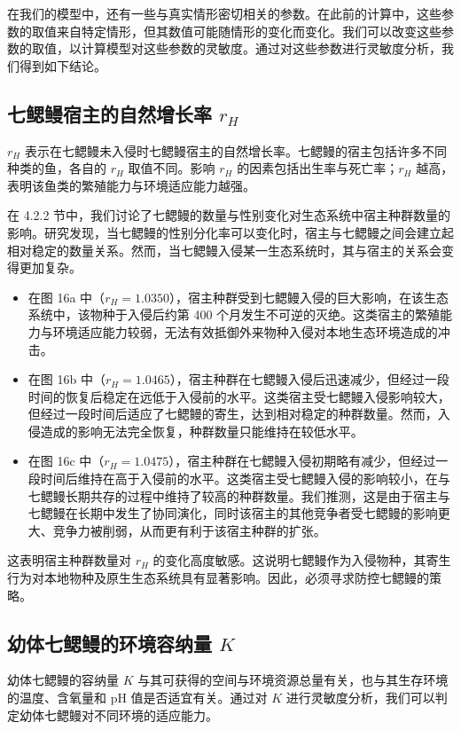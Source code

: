 \documentclass[11pt,a4paper]{ctexart}
\begin{document}
在我们的模型中，还有一些与真实情形密切相关的参数。在此前的计算中，这些参数的取值来自特定情形，但其数值可能随情形的变化而变化。我们可以改变这些参数的取值，以计算模型对这些参数的灵敏度。通过对这些参数进行灵敏度分析，我们得到如下结论。

\subsection{七鳃鳗宿主的自然增长率 $r_H$}

$r_H$ 表示在七鳃鳗未入侵时七鳃鳗宿主的自然增长率。七鳃鳗的宿主包括许多不同种类的鱼，各自的 $r_H$ 取值不同。影响 $r_H$ 的因素包括出生率与死亡率；$r_H$ 越高，表明该鱼类的繁殖能力与环境适应能力越强。

在 4.2.2 节中，我们讨论了七鳃鳗的数量与性别变化对生态系统中宿主种群数量的影响。研究发现，当七鳃鳗的性别分化率可以变化时，宿主与七鳃鳗之间会建立起相对稳定的数量关系。然而，当七鳃鳗入侵某一生态系统时，其与宿主的关系会变得更加复杂。

\begin{itemize}
\item 在图 16a 中（$r_H=1.0350$），宿主种群受到七鳃鳗入侵的巨大影响，在该生态系统中，该物种于入侵后约第 400 个月发生不可逆的灭绝。这类宿主的繁殖能力与环境适应能力较弱，无法有效抵御外来物种入侵对本地生态环境造成的冲击。
\item 在图 16b 中（$r_H=1.0465$），宿主种群在七鳃鳗入侵后迅速减少，但经过一段时间的恢复后稳定在远低于入侵前的水平。这类宿主受七鳃鳗入侵影响较大，但经过一段时间后适应了七鳃鳗的寄生，达到相对稳定的种群数量。然而，入侵造成的影响无法完全恢复，种群数量只能维持在较低水平。
\item 在图 16c 中（$r_H=1.0475$），宿主种群在七鳃鳗入侵初期略有减少，但经过一段时间后维持在高于入侵前的水平。这类宿主受七鳃鳗入侵的影响较小，在与七鳃鳗长期共存的过程中维持了较高的种群数量。我们推测，这是由于宿主与七鳃鳗在长期中发生了协同演化，同时该宿主的其他竞争者受七鳃鳗的影响更大、竞争力被削弱，从而更有利于该宿主种群的扩张。
\end{itemize}

这表明宿主种群数量对 $r_H$ 的变化高度敏感。这说明七鳃鳗作为入侵物种，其寄生行为对本地物种及原生生态系统具有显著影响。因此，必须寻求防控七鳃鳗的策略。

\subsection{幼体七鳃鳗的环境容纳量 $K$}

幼体七鳃鳗的容纳量 $K$ 与其可获得的空间与环境资源总量有关，也与其生存环境的温度、含氧量和 pH 值是否适宜有关。通过对 $K$ 进行灵敏度分析，我们可以判定幼体七鳃鳗对不同环境的适应能力。
\end{document}
